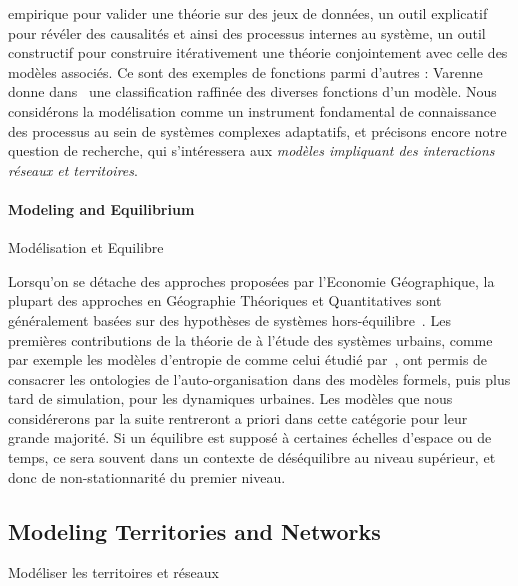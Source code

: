{empirique pour valider une théorie sur des jeux de données, un outil explicatif pour révéler des causalités et ainsi des processus internes au système, un outil constructif pour construire itérativement une théorie conjointement avec celle des modèles associés. Ce sont des exemples de fonctions parmi d'autres : Varenne donne dans~\cite{varenne2010simulations} une classification raffinée des diverses fonctions d'un modèle. Nous considérons la modélisation comme un instrument fondamental de connaissance des processus au sein de systèmes complexes adaptatifs, et précisons encore notre question de recherche, qui s'intéressera aux \emph{modèles impliquant des interactions réseaux et territoires}.
}



\paragraph{Modeling and Equilibrium}{Modélisation et Equilibre}

Lorsqu'on se détache des approches proposées par l'Economie Géographique, la plupart des approches en Géographie Théoriques et Quantitatives sont généralement basées sur des hypothèses de systèmes hors-équilibre~\cite{pumain2017geography}. Les premières contributions de la théorie de  à l'étude des systèmes urbains, comme par exemple les modèles d'entropie de  comme celui étudié par~\cite{pumain1984vers}, ont permis de consacrer les ontologies de l'auto-organisation dans des modèles formels, puis plus tard de simulation, pour les dynamiques urbaines. Les modèles que nous considérerons par la suite rentreront a priori dans cette catégorie pour leur grande majorité. Si un équilibre est supposé à certaines échelles d'espace ou de temps, ce sera souvent dans un contexte de déséquilibre au niveau supérieur, et donc de non-stationnarité du premier niveau.




\subsection{Modeling Territories and Networks}{Modéliser les territoires et réseaux}


